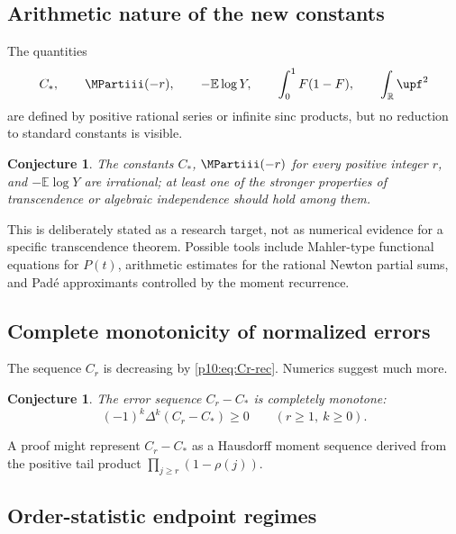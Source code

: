 \documentclass[11pt,oneside]{article}
\newtheorem{conjecture}[theorem]{Conjecture}
\theoremstyle{definition}
\theoremstyle{remark}
\newcommand{\F}{F}
\newcommand{\E}{\mathbb E}
\newcommand{\R}{\mathbb R}
\newcommand{\1}{\mathbf 1}
\begin{document}
\subsection{Arithmetic nature of the new constants}

The quantities
\begin{equation}\label{p10:eq:new-constants}
 C_*,\qquad \MPartiii(-r),\qquad -\E\log Y,
 \qquad \int_0^1\F(1-\F),\qquad \int_\R\upf^2
\end{equation}
are defined by positive rational series or infinite sinc products, but no reduction to
standard constants is visible.

\begin{conjecture}\label{p10:conj:irrationality}
The constants \(C_*\), \(\MPartiii(-r)\) for every positive integer \(r\), and
\(-\E\log Y\) are irrational; at least one of the stronger properties of
transcendence or algebraic independence should hold among them.
\end{conjecture}

This is deliberately stated as a research target, not as numerical evidence for a
specific transcendence theorem.  Possible tools include Mahler-type functional
equations for \(P(t)\), arithmetic estimates for the rational Newton partial sums, and
Pad\'e approximants controlled by the moment recurrence.

\subsection{Complete monotonicity of normalized errors}

The sequence \(C_r\) is decreasing by \cref{p10:eq:Cr-rec}.  Numerics suggest much more.

\begin{conjecture}\label{p10:conj:complete-monotone}
The error sequence \(C_r-C_*\) is completely monotone:
\begin{equation}\label{p10:eq:complete-monotone-conj}
 (-1)^k\Delta^k(C_r-C_*)\ge0
 \qquad(r\ge1,\ k\ge0).
\end{equation}
\end{conjecture}

A proof might represent \(C_r-C_*\) as a Hausdorff moment sequence derived from the
positive tail product \(\prod_{j\ge r}(1-\rho(j))\).

\subsection{Order-statistic endpoint regimes}
\end{document}
